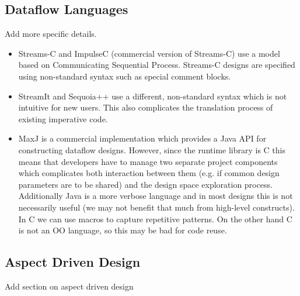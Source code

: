 \subsection{Dataflow Languages}

\TODO Add more specific details.

\begin{itemize}

\item Streams-C and ImpulseC (commercial version of Streams-C) use a
  model based on Communicating Sequential Process. Streams-C designs
  are specified using non-standard syntax such as special comment
  blocks.

\item StreamIt and Sequoia++ use a different, non-standard syntax
  which is not intuitive for new users. This also complicates the
  translation process of existing imperative code.

\item MaxJ is a commercial implementation which provides a Java API
  for constructing dataflow designs. However, since the runtime
  library is C this means that developers have to manage two separate
  project components which complicates both interaction between them
  (e.g. if common design parameters are to be shared) and the design
  space exploration process. Additionally Java is a more verbose
  language and in most designs this is not necessarily useful (we may
  not benefit that much from high-level constructs). In C we can use
  macros to capture repetitive patterns. On the other hand C is not an
  OO language, so this may be bad for code reuse.

\end{itemize}

\subsection{Aspect Driven Design}


\TODO Add section on aspect driven design
